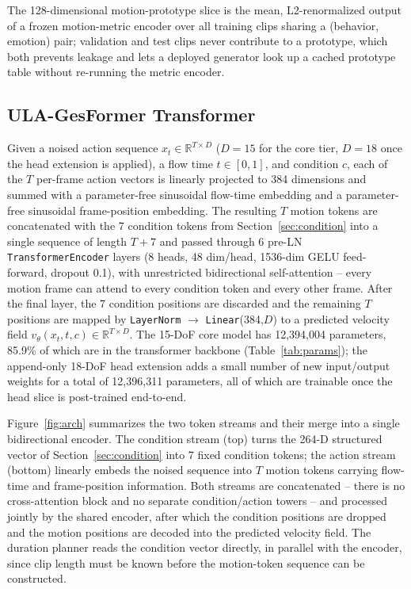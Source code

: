 \documentclass[conference]{IEEEtran}
\begin{document}
The 128-dimensional motion-prototype slice is the mean, L2-renormalized
output of a frozen motion-metric encoder over all training clips
sharing a (behavior, emotion) pair; validation and test clips never
contribute to a prototype, which both prevents leakage and lets a
deployed generator look up a cached prototype table without re-running
the metric encoder.

\subsection{ULA-GesFormer Transformer}

Given a noised action sequence $x_t \in \mathbb{R}^{T\times D}$ ($D=15$
for the core tier, $D=18$ once the head extension is applied), a flow
time $t\in[0,1]$, and condition $c$, each of the $T$ per-frame action
vectors is linearly projected to 384 dimensions and summed with a
parameter-free sinusoidal flow-time embedding and a parameter-free
sinusoidal frame-position embedding. The resulting $T$ motion tokens are
concatenated with the 7 condition tokens from
Section~\ref{sec:condition} into a single sequence of length $T+7$ and
passed through 6 pre-LN \texttt{TransformerEncoder} layers (8 heads, 48
dim/head, 1536-dim GELU feed-forward, dropout 0.1), with unrestricted
bidirectional self-attention -- every motion frame can attend to every
condition token and every other frame. After the final layer, the 7
condition positions are discarded and the remaining $T$ positions are
mapped by \texttt{LayerNorm} $\to$ \texttt{Linear}(384,$D$) to a
predicted velocity field $v_\theta(x_t,t,c)\in\mathbb{R}^{T\times D}$.
The 15-DoF core model has 12{,}394{,}004 parameters, 85.9\% of which are
in the transformer backbone (Table~\ref{tab:params}); the append-only
18-DoF head extension adds a small number of new input/output weights
for a total of 12{,}396{,}311 parameters, all of which are trainable
once the head slice is post-trained end-to-end.

Figure~\ref{fig:arch} summarizes the two token streams and their
merge into a single bidirectional encoder. The condition stream (top)
turns the 264-D structured vector of Section~\ref{sec:condition} into
7 fixed condition tokens; the action stream (bottom) linearly embeds
the noised sequence into $T$ motion tokens carrying flow-time and
frame-position information. Both streams are concatenated -- there is
no cross-attention block and no separate condition/action towers --
and processed jointly by the shared encoder, after which the condition
positions are dropped and the motion positions are decoded into the
predicted velocity field. The duration planner reads the condition
vector directly, in parallel with the encoder, since clip length must
be known before the motion-token sequence can be constructed.
\end{document}
